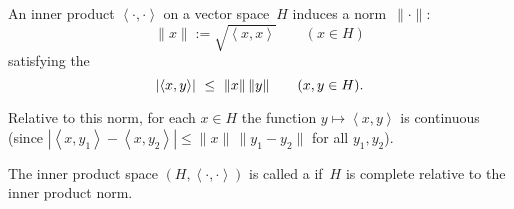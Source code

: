 \documentclass[main.tex]{subfiles}
\begin{document}
\begin{psec}{5.2}%
An inner product $\left<\cdot,\cdot\right>$
on a vector space~$H$
induces a norm~$\|\cdot\|$:
\begin{equation*}
\|x\|:=\sqrt{\left<x,x\right>}\qquad(x\in H)
\end{equation*}
satisfying the 
\begin{equation*}
\left|\left<x,y\right>\right| \ \leq\ \|x\|\,\|y\|\qquad(x,y\in H)\htam{.}
\end{equation*}

Relative to this norm,
for each $x\in H$
the function $y\mapsto \left<x,y\right>$ is continuous
(since $\left|\left<x,y_1\right>-\left<x,y_2\right>\right|
\leq\|x\|\,\|y_1 - y_2\|$ for all $y_1,y_2$).

The inner product space $(H,\left<\cdot,\cdot\right>)$ 
is called a 
if~$H$ is complete relative to the inner product norm.
\end{psec}
\clearpage
\end{document}
